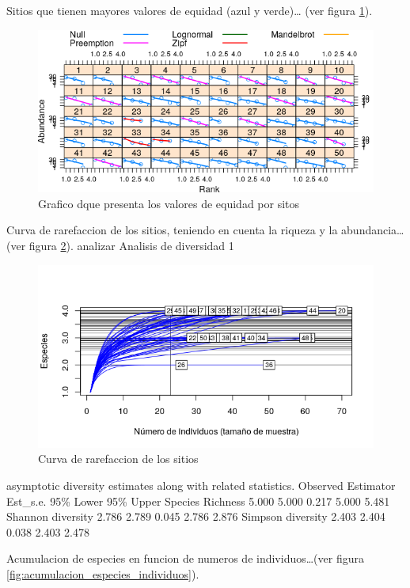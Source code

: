 \documentclass[11pt,]{article}
\begin{document}
Sitios que tienen mayores valores de equidad (azul y verde)\ldots{} (ver
figura \ref{fig:grafico_niveles_equidad}).

\begin{figure}
\centering
\includegraphics{grafico_niveles_equidad.png}
\caption{Grafico dque presenta los valores de equidad por sitos
\label{fig:grafico_niveles_equidad}}
\end{figure}

Curva de rarefaccion de los sitios, teniendo en cuenta la riqueza y la
abundancia\ldots{}(ver figura \ref{fig:Curva_rarefaccion}). analizar
Analisis de diversidad 1

\begin{figure}
\centering
\includegraphics{Curva_rarefaccion.png}
\caption{Curva de rarefaccion de los sitios
\label{fig:Curva_rarefaccion}}
\end{figure}

asymptotic diversity estimates along with related statistics. Observed
Estimator Est\_s.e. 95\% Lower 95\% Upper Species Richness 5.000 5.000
0.217 5.000 5.481 Shannon diversity 2.786 2.789 0.045 2.786 2.876
Simpson diversity 2.403 2.404 0.038 2.403 2.478

Acumulacion de especies en funcion de numeros de individuos\ldots{}(ver
figura \ref{fig:acumulacion_especies_individuos}).
\end{document}
